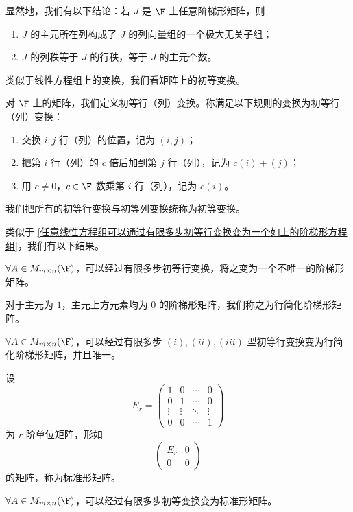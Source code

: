显然地，我们有以下结论：若 $J$ 是 $\F$ 上任意阶梯形矩阵，则
\begin{enumerate}
	\item $J$ 的主元所在列构成了 $J$ 的列向量组的一个极大无关子组；
	\item $J$ 的列秩等于 $J$ 的行秩，等于 $J$ 的主元个数。
\end{enumerate}

类似于线性方程组上的变换，我们看矩阵上的初等变换。

\begin{definition}\label{p1:concept:c2-l857}
	对 $\F$ 上的矩阵，我们定义初等行（列）变换。称满足以下规则的变换为初等行（列）变换：
	\begin{enumerate}
		\item 交换 $i,j$ 行（列）的位置，记为 $(i,j)$；
		\item 把第 $i$ 行（列）的 $c$ 倍后加到第 $j$ 行（列），记为 $c(i)+(j)$；
		\item 用 $c\neq0$，$c\in\F$ 数乘第 $i$ 行（列），记为 $c(i)$。
	\end{enumerate}
	我们把所有的初等行变换与初等列变换统称为初等变换。
\end{definition}

类似于 \ref{任意线性方程组可以通过有限多步初等行变换变为一个如上的阶梯形方程组}，我们有以下结果。

\begin{lemma}
	$\forall A\in M_{m\times n}(\F)$，可以经过有限多步初等行变换，将之变为一个不唯一的阶梯形矩阵。
\end{lemma}

\label{p1:concept:c2-l873}对于主元为 $1$，主元上方元素均为 $0$ 的阶梯形矩阵，我们称之为行简化阶梯形矩阵。

$\forall A\in M_{m\times n}(\F)$，可以经过有限多步 $(i),(ii),(iii)$ 型初等行变换变为行简化阶梯形矩阵，并且唯一。

设
\[
E_r=
\begin{pmatrix}
	1&0&\cdots&0\\
	0&1&\cdots&0\\
	\vdots&\vdots&\ddots&\vdots\\
	0&0&\cdots&1
\end{pmatrix}
\]
为 $r$ 阶单位矩阵，形如
\[
\begin{pmatrix}
	E_r&0\\
	0&0
\end{pmatrix}
\]
\label{p1:concept:c2-l894}的矩阵，称为标准形矩阵。

$\forall A\in M_{m\times n}(\F)$，可以经过有限多步初等变换变为标准形矩阵。

